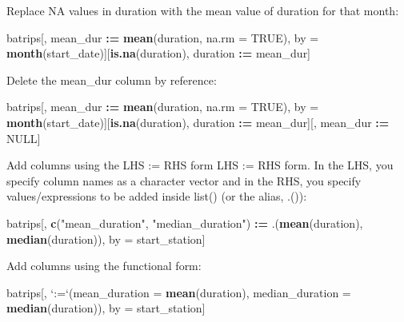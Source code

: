\documentclass[]{book}
\newenvironment{Shaded}{\begin{snugshade}}{\end{snugshade}}
\newcommand{\DataTypeTok}[1]{\textcolor[rgb]{0.13,0.29,0.53}{#1}}
\newcommand{\ErrorTok}[1]{\textcolor[rgb]{0.64,0.00,0.00}{\textbf{#1}}}
\newcommand{\KeywordTok}[1]{\textcolor[rgb]{0.13,0.29,0.53}{\textbf{#1}}}
\newcommand{\NormalTok}[1]{#1}
\newcommand{\OperatorTok}[1]{\textcolor[rgb]{0.81,0.36,0.00}{\textbf{#1}}}
\newcommand{\OtherTok}[1]{\textcolor[rgb]{0.56,0.35,0.01}{#1}}
\newcommand{\StringTok}[1]{\textcolor[rgb]{0.31,0.60,0.02}{#1}}
\begin{document}
Replace NA values in duration with the mean value of duration for that month:

\begin{Shaded}
\begin{Highlighting}[]
\NormalTok{batrips[, mean_dur }\OperatorTok{:}\ErrorTok{=}\StringTok{ }\KeywordTok{mean}\NormalTok{(duration, }\DataTypeTok{na.rm =} \OtherTok{TRUE}\NormalTok{), }
\NormalTok{            by =}\StringTok{ }\KeywordTok{month}\NormalTok{(start_date)][}\KeywordTok{is.na}\NormalTok{(duration), }
\NormalTok{                                    duration }\OperatorTok{:}\ErrorTok{=}\StringTok{ }\NormalTok{mean_dur]}
\end{Highlighting}
\end{Shaded}

Delete the mean\_dur column by reference:

\begin{Shaded}
\begin{Highlighting}[]
\NormalTok{batrips[, mean_dur }\OperatorTok{:}\ErrorTok{=}\StringTok{ }\KeywordTok{mean}\NormalTok{(duration, }\DataTypeTok{na.rm =} \OtherTok{TRUE}\NormalTok{), }
\NormalTok{            by =}\StringTok{ }\KeywordTok{month}\NormalTok{(start_date)][}\KeywordTok{is.na}\NormalTok{(duration), }
\NormalTok{                                    duration }\OperatorTok{:}\ErrorTok{=}\StringTok{ }\NormalTok{mean_dur][, mean_dur }\OperatorTok{:}\ErrorTok{=}\StringTok{ }\OtherTok{NULL}\NormalTok{]}
\end{Highlighting}
\end{Shaded}

Add columns using the LHS := RHS form
LHS := RHS form. In the LHS, you specify column names as a character vector and in the RHS, you specify values/expressions to be added inside list() (or the alias, .()):

\begin{Shaded}
\begin{Highlighting}[]
\NormalTok{batrips[, }\KeywordTok{c}\NormalTok{(}\StringTok{"mean_duration"}\NormalTok{, }
            \StringTok{"median_duration"}\NormalTok{) }\OperatorTok{:}\ErrorTok{=}\StringTok{ }\NormalTok{.(}\KeywordTok{mean}\NormalTok{(duration), }\KeywordTok{median}\NormalTok{(duration)), }
\NormalTok{        by =}\StringTok{ }\NormalTok{start_station]}
\end{Highlighting}
\end{Shaded}

Add columns using the functional form:

\begin{Shaded}
\begin{Highlighting}[]
\NormalTok{batrips[, }\StringTok{`}\DataTypeTok{:=}\StringTok{`}\NormalTok{(}\DataTypeTok{mean_duration =} \KeywordTok{mean}\NormalTok{(duration), }
               \DataTypeTok{median_duration =} \KeywordTok{median}\NormalTok{(duration)), }
\NormalTok{        by =}\StringTok{ }\NormalTok{start_station]}
\end{Highlighting}
\end{Shaded}
\end{document}
